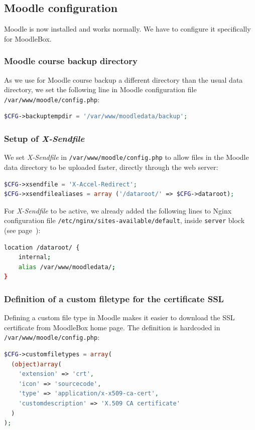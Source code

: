 \documentclass[12pt]{article}
\begin{document}
\subsection{Moodle configuration}

Moodle is now installed and works normally.
We have to configure it specifically for MoodleBox.

\subsubsection{Moodle course backup directory}

As we use for Moodle course backup a different directory than the usual data directory, we set the following line in Moodle configuration file \lstinline{/var/www/moodle/config.php}:
\begin{lstlisting}[language=php]
$CFG->backuptempdir = '/var/www/moodledata/backup';
\end{lstlisting}

\subsubsection{Setup of \emph{X-Sendfile}}

We set \emph{X-Sendfile} in \lstinline{/var/www/moodle/config.php} to allow files in the Moodle data directory to be uploaded faster, directly through the web server:
\begin{lstlisting}[language=php]
$CFG->xsendfile = 'X-Accel-Redirect';
$CFG->xsendfilealiases = array ('/dataroot/' => $CFG->dataroot);
\end{lstlisting}
For \emph{X-Sendfile} to be active, we already added the following lines to Nginx configuration file \lstinline{/etc/nginx/sites-available/default}, inside \lstinline{server} block (see page~\pageref{ssec-nginx-php}):
\begin{lstlisting}[language=bash]
location /dataroot/ {
    internal;
    alias /var/www/moodledata/;
}
\end{lstlisting}

\subsubsection{Definition of a custom filetype for the certificate SSL}

Defining a custom file type in Moodle makes it easier to download the SSL certificate from MoodleBox home page.
The definition is hardcoded in \lstinline{/var/www/moodle/config.php}:
\begin{lstlisting}[language=php]
$CFG->customfiletypes = array(
  (object)array(
    'extension' => 'crt',
    'icon' => 'sourcecode',
    'type' => 'application/x-x509-ca-cert',
    'customdescription' => 'X.509 CA certificate'
  )
);
\end{lstlisting}
\end{document}
